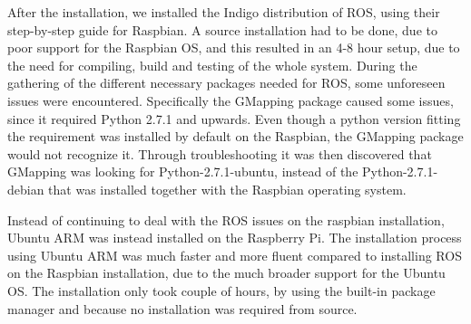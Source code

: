 After the installation, we installed the Indigo distribution of ROS, using their step-by-step guide for Raspbian.
A source installation had to be done, due to poor support for the Raspbian OS, and this resulted in an 4-8 hour setup, due to the need for compiling, build and testing of the whole system. During the gathering of the different necessary packages needed for ROS, some unforeseen issues were encountered. Specifically the GMapping package caused some issues, since it required Python 2.7.1 and upwards. Even though a python version fitting the requirement was installed by default on the Raspbian, the GMapping package would not recognize it. Through troubleshooting it was then discovered that GMapping was looking for Python-2.7.1-ubuntu, instead of the Python-2.7.1-debian that was installed together with the Raspbian operating system.

Instead of continuing to deal with the ROS issues on the raspbian installation, Ubuntu ARM was instead installed on the Raspberry Pi.
The installation process using Ubuntu ARM was much faster and more fluent compared to installing ROS on the Raspbian installation, due to the much broader support for the Ubuntu OS. The installation only took couple of hours, by using the built-in package manager and because no installation was required from source.


